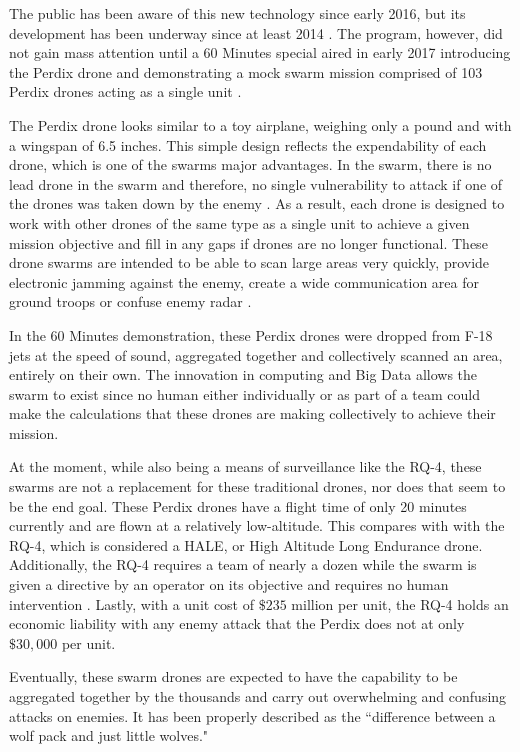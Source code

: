 \documentclass[sigconf]{acmart}
\begin{document}
The public has been aware of this new technology since early 2016, but its development has been underway since at least 2014 \cite{washpost}. The program, however, did not gain mass attention until a 60 Minutes special aired in early 2017 introducing the Perdix drone and demonstrating a mock swarm mission comprised of 103 Perdix drones acting as a single unit \cite{60minutes}. 

The Perdix drone looks similar to a toy airplane, weighing only a pound and with a wingspan of 6.5 inches. This simple design reflects the expendability of each drone, which is one of the swarms major advantages. In the swarm, there is no lead drone in the swarm and therefore, no single vulnerability to attack if one of the drones was taken down by the enemy \cite{mitswarm}. As a result, each drone is designed to work with other drones of the same type as a single unit to achieve a given mission objective and fill in any gaps if drones are no longer functional. These drone swarms are intended to be able to scan large areas very quickly, provide electronic jamming against the enemy, create a wide communication area for ground troops or confuse enemy radar \cite{popularmechanics}.

In the 60 Minutes demonstration, these Perdix drones were dropped from F-18 jets at the speed of sound, aggregated together and collectively scanned an area, entirely on their own. The innovation in computing and Big Data allows the swarm to exist since no human either individually or as part of a  team could make the calculations that these drones are making collectively to achieve their mission.

 At the moment, while also being a means of surveillance like the RQ-4, these swarms are not a replacement for these traditional drones, nor does that seem to be the end goal. These Perdix drones have a flight time of only 20 minutes currently and are flown at a relatively low-altitude. This compares with with the RQ-4, which is considered a HALE, or High Altitude Long Endurance drone. Additionally, the RQ-4 requires a team of nearly a dozen while the swarm is given a directive by an operator on its objective and requires no human intervention \cite{ftswarm}. Lastly, with a unit cost of $\$235$ million per unit, the RQ-4 holds an economic liability with any enemy attack that the Perdix does not at only $\$30,000$ per unit. 

Eventually, these swarm drones are expected to have the capability to be aggregated together by the thousands and carry out overwhelming and confusing attacks on enemies. It has been properly described as the ``difference between a wolf pack and just little wolves\cite{ftswarm}."
\end{document}

